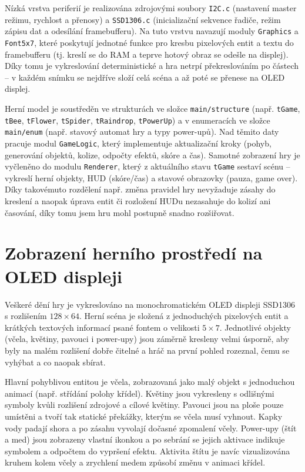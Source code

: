\documentclass[11pt,a4paper]{article}
\begin{document}
Nízká vrstva periferií je realizována zdrojovými soubory \texttt{I2C.c} (nastavení master režimu, rychlost a přenosy) a \texttt{SSD1306.c} (inicializační sekvence řadiče, režim zápisu dat a odesílání framebufferu). Na tuto vrstvu navazují moduly \texttt{Graphics} a \texttt{Font5x7}, které poskytují jednotné funkce pro kresbu pixelových entit a textu do framebufferu (tj. kreslí se do RAM a teprve hotový obraz se odešle na displej). Díky tomu je vykreslování deterministické a hra netrpí překreslováním po částech -- v každém snímku se nejdříve složí celá scéna a až poté se přenese na OLED displej.

Herní model je soustředěn ve strukturách ve složce \texttt{main/structure} (např. \texttt{tGame}, \texttt{tBee}, \texttt{tFlower}, \texttt{tSpider}, \texttt{tRaindrop}, \texttt{tPowerUp}) a v enumeracích ve složce \texttt{main/enum} (např. stavový automat hry a typy power-upů). Nad těmito daty pracuje modul \texttt{GameLogic}, který implementuje aktualizační kroky (pohyb, generování objektů, kolize, odpočty efektů, skóre a čas). Samotné zobrazení hry je vyčleněno do modulu \texttt{Renderer}, který z aktuálního stavu \texttt{tGame} sestaví scénu -- vykreslí herní objekty, HUD (skóre/čas) a stavové obrazovky (pauza, game over). Díky takovémuto rozdělení např. změna pravidel hry nevyžaduje zásahy do kreslení a naopak úprava entit či rozložení HUDu nezasahuje do kolizí ani časování, díky tomu jsem hru mohl postupně snadno rozšiřovat.

\section{Zobrazení herního prostředí na OLED displeji}

Veškeré dění hry je vykreslováno na monochromatickém OLED displeji SSD1306 s rozlišením $128\times64$. Herní scéna je složená z jednoduchých pixelových entit a krátkých textových 
informací psané fontem o velikosti $5\times7$. Jednotlivé objekty (včela, květiny, pavouci i power-upy) jsou záměrně kresleny velmi úsporně, aby byly na malém rozlišení dobře čitelné
a hráč na první pohled rozeznal, čemu se vyhýbat a co naopak sbírat.

Hlavní pohyblivou entitou je včela, zobrazovaná jako malý objekt s jednoduchou animací (např. střídání polohy křídel). Květiny jsou vykresleny s odlišnými symboly kvůli rozlišení zdrojové a 
cílové květiny. Pavouci jsou na ploše pouze umístěni a tvoří tak statické překážky, kterým se včela musí vyhnout. Kapky vody padají shora a po zásahu vyvolají dočasné zpomalení včely.
Power-upy (štít a med) jsou zobrazeny vlastní ikonkou a po sebrání se jejich aktivace indikuje symbolem a odpočtem do vypršení efektu. Aktivita štítu je navíc vizualizována kruhem kolem včely a 
zrychlení medem způsobí změnu v animaci křídel.
\end{document}
